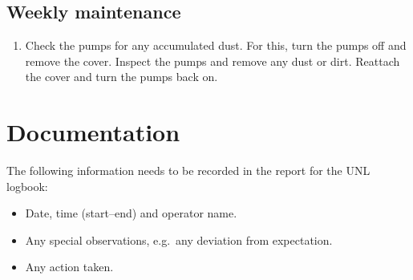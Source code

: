 \documentclass[12pt]{unlsilabsop}
\begin{document}
\subsection{Weekly maintenance}
\begin{enumerate}
    \item Check the pumps for any accumulated dust. For this, turn the pumps off and remove the cover. Inspect the pumps and remove any dust or dirt. Reattach the cover and turn the pumps back on.
\end{enumerate}

\section{Documentation}
The following information needs to be recorded in the report for the UNL logbook:
\begin{itemize}
    \item Date, time (start--end) and operator name.
    \item Any special observations, e.g.~any deviation from expectation.
    \item Any action taken.
\end{itemize}
\end{document}

